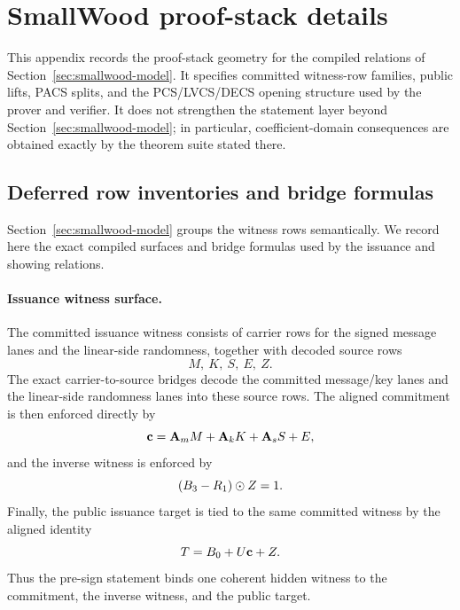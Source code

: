 \section{SmallWood proof-stack details}
\label{app:smallwood}
\label{app:smallwood-details}

This appendix records the proof-stack geometry for the compiled relations of
Section~\ref{sec:smallwood-model}. It specifies committed witness-row families,
public lifts, PACS splits, and the PCS/LVCS/DECS opening structure used by the
prover and verifier. It does not strengthen the statement layer beyond
Section~\ref{sec:smallwood-model}; in particular, coefficient-domain
consequences are obtained exactly by the theorem suite stated there.

\newcommand{\NTT}{\mathrm{NTT}}

\subsection{Deferred row inventories and bridge formulas}
\label{subsec:smallwood-row-inventories}

Section~\ref{sec:smallwood-model} groups the witness rows semantically. We record here the exact compiled surfaces and
bridge formulas used by the issuance and showing relations.

\paragraph{Issuance witness surface.}
The committed issuance witness consists of carrier rows for the signed message lanes and the linear-side
randomness, together with decoded source rows
\[
M,\ K,\ S,\ E,\ Z.
\]
The exact carrier-to-source bridges decode the committed message/key lanes and the linear-side randomness lanes
into these source rows. The aligned commitment is then enforced directly by
\[
\mathbf{c} = \mathbf{A}_m M + \mathbf{A}_k K + \mathbf{A}_s S + E,
\]
and the inverse witness is enforced by
\[
(B_3-R_1)\odot Z = 1.
\]
Finally, the public issuance target is tied to the same committed witness by the aligned identity
\[
T = B_0 + U\mathbf{c} + Z.
\]
Thus the pre-sign statement binds one coherent hidden witness to the commitment, the inverse witness, and the
public target.

